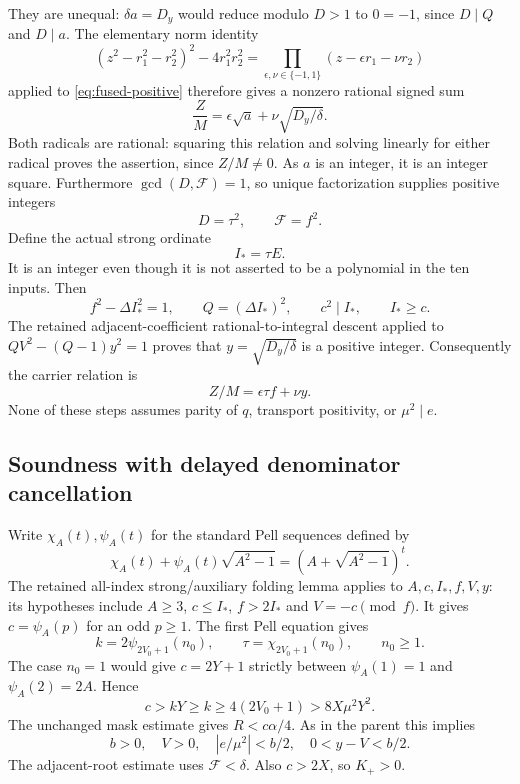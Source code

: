 They are unequal: $\delta a=D_y$ would reduce modulo $D>1$ to
$0=-1$, since $D\mid Q$ and $D\mid a$. The elementary norm identity
\[
 (z^2-r_1^2-r_2^2)^2-4r_1^2r_2^2
 =\prod_{\epsilon,\nu\in\{-1,1\}}(z-\epsilon r_1-\nu r_2)
\]
applied to \eqref{eq:fused-positive} therefore gives a nonzero rational
signed sum
\[
 \frac ZM=\epsilon\sqrt a+\nu\sqrt{D_y/\delta}.
\]
Both radicals are rational: squaring this relation and solving linearly
for either radical proves the assertion, since $Z/M\ne0$. As $a$ is an
integer, it is an integer square. Furthermore
$\gcd(D,\mathcal F)=1$, so unique factorization supplies positive integers
\[
       D=\tau^2,\qquad \mathcal F=f^2.
\]
Define the actual strong ordinate
\[
       I_* = \tau E.
\]
It is an integer even though it is not asserted to be a polynomial in the
ten inputs. Then
\[
 f^2-\Delta I_*^2=1,\qquad Q=(\Delta I_*)^2,\qquad
 c^2\mid I_*,\qquad I_*\ge c.
\]
The retained adjacent-coefficient rational-to-integral descent applied to
$QV^2-(Q-1)y^2=1$ proves that $y=\sqrt{D_y/\delta}$ is a positive integer.
Consequently the carrier relation is
\begin{equation}\label{eq:fused-signed}
                  Z/M=\epsilon\tau f+\nu y.
\end{equation}
None of these steps assumes parity of $q$, transport positivity, or
$\mu^2\mid e$.

\subsection{Soundness with delayed denominator cancellation}
Write $\chi_A(t),\psi_A(t)$ for the standard Pell sequences defined by
\[
 \chi_A(t)+\psi_A(t)\sqrt{A^2-1}
       =(A+\sqrt{A^2-1})^t.
\]
The retained all-index strong/auxiliary folding lemma applies to
$A,c,I_*,f,V,y$: its hypotheses include $A\ge3$, $c\le I_*$,
$f>2I_*$ and $V=-c\pmod f$. It gives
$c=\psi_A(p)$ for an odd $p\ge1$. The first Pell equation gives
\[
 k=2\psi_{2V_0+1}(n_0),\qquad
 \tau=\chi_{2V_0+1}(n_0),\qquad n_0\ge1.
\]
The case $n_0=1$ would give $c=2Y+1$ strictly between
$\psi_A(1)=1$ and $\psi_A(2)=2A$. Hence
\begin{equation}\label{eq:fused-cbound}
 c>kY\ge k\ge4(2V_0+1)>8X\mu^2Y^2.
\end{equation}
The unchanged mask estimate gives $R<c\alpha/4$. As in the parent this
implies
\[
 b>0,\quad V>0,\quad |e/\mu^2|<b/2,\quad 0<y-V<b/2.
\]
The adjacent-root estimate uses $\mathcal F<\delta$. Also $c>2X$, so
$K_+>0$.

